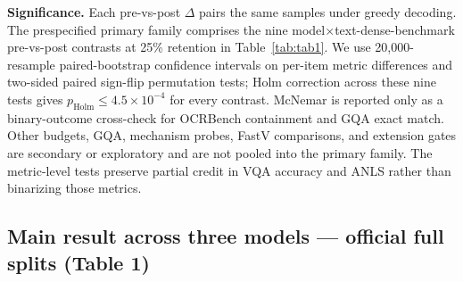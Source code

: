 \documentclass[journal]{IEEEtran}
\begin{document}
\textbf{Significance.} Each pre-vs-post $\Delta$ pairs the same samples under
greedy decoding. The prespecified primary family comprises the nine
model$\times$text-dense-benchmark pre-vs-post contrasts at 25\% retention in
Table~\ref{tab:tab1}. We use 20,000-resample paired-bootstrap confidence
intervals on per-item metric differences and two-sided paired sign-flip
permutation tests; Holm correction across these nine tests gives
$p_{\mathrm{Holm}}\leq4.5\times10^{-4}$ for every contrast. McNemar is reported
only as a binary-outcome cross-check for OCRBench containment and GQA exact
match. Other budgets, GQA, mechanism probes, FastV comparisons, and extension
gates are secondary or exploratory and are not pooled into the primary family.
The metric-level tests preserve partial credit in VQA accuracy and ANLS rather
than binarizing those metrics.

\subsection{Main result across three models --- official full splits (Table 1)}\label{sec:qwen}
\end{document}
